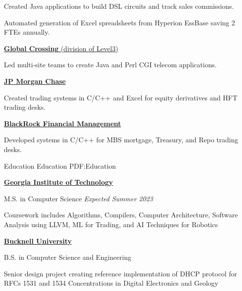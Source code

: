 \documentclass[letterpaper,MMMMyyyy,nonstopmode]{simpleresumecv}
\newif\ifLOCATION
\begin{document}
\begin{Body}
\begin{Detail}
Created Java applications to build DSL circuits and track sales commissions.

Automated generation of Excel spreadsheets from Hyperion EssBase saving 2 FTEs annually.
\end{Detail}

\BigGap
\Entry
\href{http://www.globalcrossing.com/}
{\textbf{Global  Crossing} (division of Level3)}

\begin{Detail}
Led multi-site teams to create Java and Perl CGI telecom applications.
\end{Detail}

\BigGap
\Entry
\href{http://www.jpmorganchase.com/}
{\textbf{JP Morgan Chase}}
\begin{Detail}
Created trading systems in C/C++ and Excel for equity derivatives and HFT trading desks.
\end{Detail}

\BigGap
\Entry
\href{http://www.blackrock.com/}
{\textbf{BlackRock Financial Management}}
\begin{Detail}
Developed systems in C/C++ for MBS mortgage, Treasury, and Repo trading desks.
\end{Detail}
\fi %
%

\Section
{Education}
{Education}
{PDF:Education}

\Entry
\href{https://gatech.edu}
{\textbf{Georgia Institute of Technology}}

M.S. in Computer Science
\hfill 
\textit{Expected Summer 2023}

\BulletItem
Coursework includes Algorithms, Compilers, Computer Architecture, Software Analysis using LLVM, ML for Trading, and AI Techniques for Robotics

\Gap

\Entry
\href{http://www.bucknell.edu/}
{\textbf{Bucknell University}}
\ifLOCATION
\hfill Lewisburg, Pennsylvania
\fi

B.S. in Computer Science and Engineering
\iffalse
\hfill
\DatestampYM{1988}{09} --
\DatestampYM{1992}{06}
\fi
\begin{Detail}
\BulletItem
Senior design project creating reference implementation of DHCP protocol for RFCs 1531 and 1534
\BulletItem
Concentrations in Digital Electronics and Geology


\end{Detail}
\end{Body}
\end{document}
